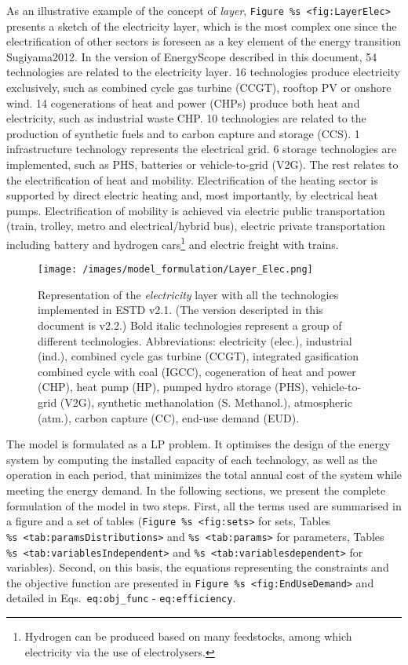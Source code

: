 \documentclass[
]{article}
\begin{document}
As an illustrative example of the concept of \emph{layer},
\texttt{Figure\ \%s\ \textless{}fig:LayerElec\textgreater{}} presents a
sketch of the electricity layer, which is the most complex one since the
electrification of other sectors is foreseen as a key element of the
energy transition Sugiyama2012. In the version of EnergyScope described
in this document, 54 technologies are related to the electricity layer.
16 technologies produce electricity exclusively, such as combined cycle
gas turbine (CCGT), rooftop PV or onshore wind. 14 cogenerations of heat
and power (CHPs) produce both heat and electricity, such as industrial
waste CHP. 10 technologies are related to the production of synthetic
fuels and to carbon capture and storage (CCS). 1 infrastructure
technology represents the electrical grid. 6 storage technologies are
implemented, such as PHS, batteries or vehicle-to-grid (V2G). The rest
relates to the electrification of heat and mobility. Electrification of
the heating sector is supported by direct electric heating and, most
importantly, by electrical heat pumps. Electrification of mobility is
achieved via electric public transportation (train, trolley, metro and
electrical/hybrid bus), electric private transportation including
battery and hydrogen cars\footnote{Hydrogen can be produced based on
  many feedstocks, among which electricity via the use of electrolysers.}
and electric freight with trains.

\begin{figure}
\centering
\texttt{[image: /images/model\_formulation/Layer\_Elec.png]}
\caption{Representation of the \emph{electricity} layer with all the
technologies implemented in ESTD v2.1. (The version descripted in this
document is v2.2.) Bold italic technologies represent a group of
different technologies. Abbreviations: electricity (elec.), industrial
(ind.), combined cycle gas turbine (CCGT), integrated gasification
combined cycle with coal (IGCC), cogeneration of heat and power (CHP),
heat pump (HP), pumped hydro storage (PHS), vehicle-to-grid (V2G),
synthetic methanolation (S. Methanol.), atmospheric (atm.), carbon
capture (CC), end-use demand (EUD).}
\end{figure}

The model is formulated as a LP problem. It optimises the design of the
energy system by computing the installed capacity of each technology, as
well as the operation in each period, that minimizes the total annual
cost of the system while meeting the energy demand. In the following
sections, we present the complete formulation of the model in two steps.
First, all the terms used are summarised in a figure and a set of tables
(\texttt{Figure\ \%s\ \textless{}fig:sets\textgreater{}} for sets,
Tables \texttt{\%s\ \textless{}tab:paramsDistributions\textgreater{}}
and \texttt{\%s\ \textless{}tab:params\textgreater{}} for parameters,
Tables \texttt{\%s\ \textless{}tab:variablesIndependent\textgreater{}}
and \texttt{\%s\ \textless{}tab:variablesdependent\textgreater{}} for
variables). Second, on this basis, the equations representing the
constraints and the objective function are presented in
\texttt{Figure\ \%s\ \textless{}fig:EndUseDemand\textgreater{}} and
detailed in Eqs.~\texttt{eq:obj\_func} - \texttt{eq:efficiency}.
\end{document}
